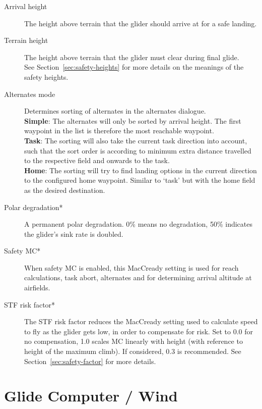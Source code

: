 \begin{description}
\item[Arrival height]  \label{conf:safetyarrival} The height above terrain that the glider
  should arrive at for a safe landing.
\item[Terrain height]  \label{conf:safetyterrain} The height above terrain that 
  the glider must clear during final glide. \\
See Section~\ref{sec:safety-heights} for more details on the meanings
of the safety heights. \\
\item[Alternates mode]  \label{conf:alternatesmode} Determines sorting of alternates 
  in the alternates dialogue. \\
  {\bf Simple}: The alternates will only be sorted by arrival height. 
    The first waypoint in the list is therefore the most reachable waypoint. \\
  {\bf Task}: The sorting will also take the current task direction into account, 
    such that the sort order is according to minimum extra distance travelled to 
    the respective field and onwards to the task. \\
  {\bf Home}: The sorting will try to find landing options in the current direction 
    to the configured home waypoint.  Similar to `task' but with 
    the home field as the desired destination.
\item[Polar degradation*]  A permanent polar degradation. 0\% means no degradation, 
  50\% indicates the glider's sink rate is doubled.
\item[Safety MC*]  When safety MC is enabled, this MacCready setting is used for reach 
  calculations, task abort, alternates and for determining arrival altitude at airfields.\label{conf:safetyMC} 
\item[STF risk factor*] 
  The STF risk factor reduces the MacCready setting used to calculate
  speed to fly as the glider gets low, in order to compensate for
  risk.  Set to 0.0 for no compensation, 1.0 scales MC linearly with
  height (with reference to height of the maximum climb). If considered, 0.3 is recommended.  
  See Section~\ref{sec:safety-factor} for more details.
\end{description}


\section{Glide Computer / Wind} \label{sec:wind}

